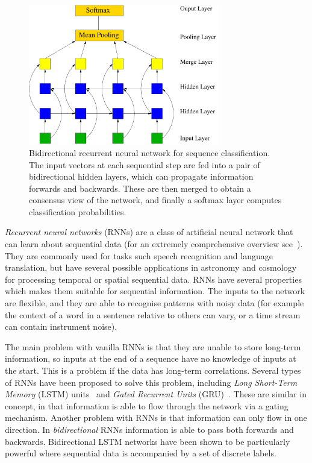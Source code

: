 \documentclass[twocolumn]{aastex61}
\begin{document}
\begin{figure}
\centering
\includegraphics[width=83mm, angle=0]{f1.pdf}
\caption{\label{fig:network} Bidirectional recurrent neural network for sequence classification. The input vectors at each sequential step are fed into a pair of bidirectional hidden layers, which can propagate information forwards and backwards. These are then merged to obtain a consensus view of the network, and finally a softmax layer computes classification probabilities. 
 }
\end{figure}

{\em Recurrent neural networks} (RNNs) are a class of artificial neural network  that can learn about sequential data (for an extremely comprehensive overview see~\cite{medsker1999recurrent}). They are commonly used for tasks such speech recognition and language translation, but have several possible applications in astronomy  and cosmology for processing temporal or spatial sequential data. RNNs have several properties which makes them suitable for sequential information. The inputs to the network are flexible, and they are able to recognise patterns with noisy data (for example the context of a word in a sentence relative to others can vary, or a time stream can contain instrument noise). 

The main problem with vanilla RNNs  is that they are unable to store long-term information, so inputs at the end of a sequence have no knowledge of inputs at the start. This is a problem if the data has long-term correlations. Several types of RNNs have been proposed to solve this problem, including {\em Long Short-Term Memory} (LSTM) units~\cite{LSTM} and {\em Gated Recurrent Units} (GRU)~\cite{2014arXiv1412.3555C}. These are similar in concept, in that information is able to flow through the network via a gating mechanism. Another problem with RNNs is that information can only flow in one direction. In {\em bidirectional} RNNs information is able to pass both forwards and backwards. Bidirectional LSTM networks have been shown to be particularly powerful where sequential data is accompanied by a set of discrete labels. 
\end{document}
